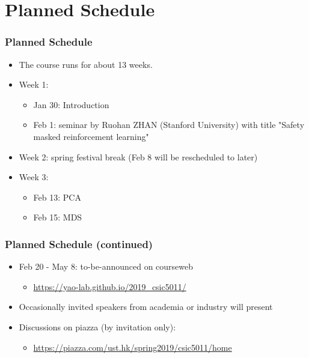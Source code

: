 \documentclass[10pt,mathserif]{beamer}
\begin{document}
\section{Planned Schedule}

\begin{frame}
\frametitle{Planned Schedule}
\begin{itemize}\itemsep=12pt
\item The course runs for about 13 weeks.
\vspace*{0.5em}
\item Week 1: 
\vspace*{0.5em}
\begin{itemize}
\item Jan 30: Introduction 
\item Feb 1:  seminar by Ruohan ZHAN (Stanford University) with title "Safety masked reinforcement learning"
\end{itemize}
\item Week 2: spring festival break (Feb 8 will be rescheduled to later)
\vspace*{0.5em}
\item Week 3: 
\vspace*{0.5em}
\begin{itemize}
\item Feb 13: PCA
\item Feb 15: MDS
\end{itemize}
\end{itemize}
\end{frame}

\begin{frame}
\frametitle{Planned Schedule (continued)}
\begin{itemize}\itemsep=12pt
\item Feb 20 - May 8: to-be-announced on courseweb
\vspace*{0.5em}
\begin{itemize}
\item \url{https://yao-lab.github.io/2019_csic5011/}
\end{itemize}
\item Occasionally invited speakers from academia or industry will present
\vspace*{0.5em}
\item Discussions on piazza (by invitation only):
\vspace*{0.5em}
\begin{itemize}
\item \url{https://piazza.com/ust.hk/spring2019/csic5011/home}
\end{itemize}
\end{itemize}
\end{frame}
\end{document}
